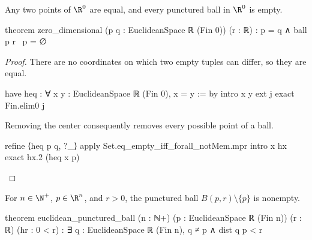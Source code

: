\begin{lemma}
  \label{ma:lem:zero-dimensional}
  Any two points of $\R^{0}$ are equal, and every punctured ball in $\R^{0}$ is empty.

  \begin{lean}
    theorem zero_dimensional (p q : EuclideanSpace ℝ (Fin 0)) (r : ℝ) :
        p = q ∧ ball p r \ {p} = ∅
  \end{lean}
\end{lemma}

\begin{proof}
  There are no coordinates on which two empty tuples can differ, so they are equal.

  \begin{lean}
    have heq : ∀ x y : EuclideanSpace ℝ (Fin 0), x = y := by
      intro x y
      ext j
      exact Fin.elim0 j
  \end{lean}

  Removing the center consequently removes every possible point of a ball.

  \begin{lean}
    refine ⟨heq p q, ?_⟩
    apply Set.eq_empty_iff_forall_notMem.mpr
    intro x hx
    exact hx.2 (heq x p)
  \end{lean}
\end{proof}

\begin{lemma}
  \label{ma:lem:deleted-neighborhood-in-Rn-is-non-empty}
  For $n\in\N^{+}$, $p\in\R^{n}$, and $r>0$, the punctured ball $B(p,r)\setminus\{p\}$ is
  nonempty.

  \begin{lean}
    theorem euclidean_punctured_ball (n : ℕ+)
        (p : EuclideanSpace ℝ (Fin n)) (r : ℝ) (hr : 0 < r) :
        ∃ q : EuclideanSpace ℝ (Fin n), q ≠ p ∧ dist q p < r
  \end{lean}
\end{lemma}

